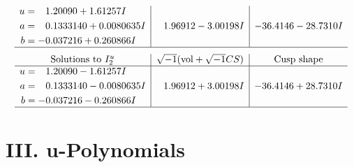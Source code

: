 \documentclass[1p]{elsarticle_modified}
\theoremstyle{definition}
\newcommand{\I}{\sqrt{-1}}
\begin{document}
$$\begin{array}{c|c|c}
\begin{aligned}
u &= \phantom{-}1.20090 + 1.61257 I \\
a &= \phantom{-}0.1333140 + 0.0080635 I \\
b &= -0.037216 + 0.260866 I\end{aligned}
 & \phantom{-}1.96912 - 3.00198 I & -36.4146 - 28.7310 I\\
 \hline 
 \end{array}$$\newpage$$\begin{array}{c|c|c}  
\text{Solutions to }I^u_{2}& \I (\text{vol} + \sqrt{-1}CS) & \text{Cusp shape}\\
 \hline 
\begin{aligned}
u &= \phantom{-}1.20090 - 1.61257 I \\
a &= \phantom{-}0.1333140 - 0.0080635 I \\
b &= -0.037216 - 0.260866 I\end{aligned}
 & \phantom{-}1.96912 + 3.00198 I & -36.4146 + 28.7310 I\\
 \hline 
 \end{array}$$\newpage
\newpage\renewcommand{\arraystretch}{1}
\centering \section*{ III. u-Polynomials}
\end{document}
